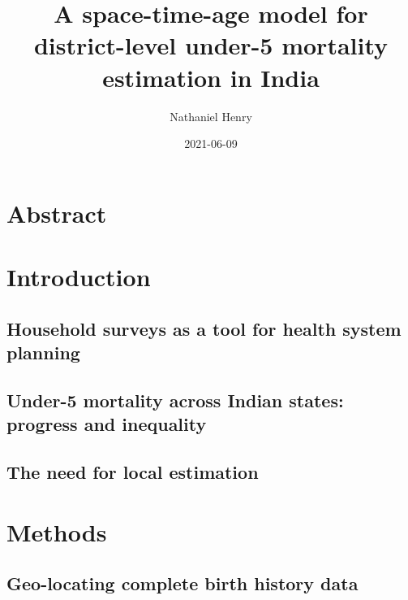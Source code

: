 \documentclass[
]{article}
\title{A space-time-age model for district-level under-5 mortality estimation in India}
\author{Nathaniel Henry}
\date{2021-06-09}
\begin{document}
\maketitle

\hypertarget{abstract}{%
\section{Abstract}\label{abstract}}

\lipsum[1]

\hypertarget{introduction}{%
\section{Introduction}\label{introduction}}

\lipsum[1-3]

\hypertarget{household-surveys-as-a-tool-for-health-system-planning}{%
\subsection{Household surveys as a tool for health system planning}\label{household-surveys-as-a-tool-for-health-system-planning}}

\lipsum[4-6]

\hypertarget{under-5-mortality-across-indian-states-progress-and-inequality}{%
\subsection{Under-5 mortality across Indian states: progress and inequality}\label{under-5-mortality-across-indian-states-progress-and-inequality}}

\lipsum[7-9]

\hypertarget{the-need-for-local-estimation}{%
\subsection{The need for local estimation}\label{the-need-for-local-estimation}}

\lipsum[10-11]

\hypertarget{methods}{%
\section{Methods}\label{methods}}

\lipsum[12-15]

\hypertarget{geo-locating-complete-birth-history-data}{%
\subsection{Geo-locating complete birth history data}\label{geo-locating-complete-birth-history-data}}
\end{document}
